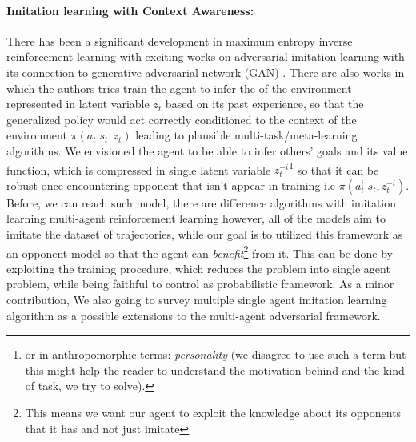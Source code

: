 \paragraph{Imitation learning with Context Awareness: } There has been a significant development in maximum entropy inverse reinforcement learning \cite{ziebart2008maximum} with exciting works on adversarial imitation learning \cite{ho2016generative, fu2017learning, ghasemipour2019divergence} with its connection to generative adversarial network (GAN) \cite{goodfellow2014generative, finn2016connection}. There are also works \cite{petangoda2019disentangled, rakelly2019efficient, yu2019meta} in which the authors tries train the agent to infer the  of the environment represented in latent variable $z_t$ based on its past experience, so that the generalized policy would act correctly conditioned to the context of the environment $\pi(a_t | s_t, z_t)$ leading to plausible multi-task/meta-learning algorithms. We envisioned the agent to be able to infer others' goals and its value function, which is compressed in single latent variable $z_t^{-i}$\footnote{or in anthropomorphic terms: \textit{personality} (we disagree to use such a term but this might help the reader to understand the motivation behind and the kind of task, we try to solve).} so that it can be robust once encountering opponent that isn't appear in training i.e $\pi(a_t^i | s_t, z^{-i}_t)$. Before, we can reach such model, there are difference algorithms with imitation learning multi-agent reinforcement learning \cite{song2018multi, yu2019multi, liu2020multi} however, all of the models aim to imitate the dataset of trajectories, while our goal is to utilized this framework as an opponent model so that the agent can \textit{benefit}\footnote{This means we want our agent to exploit the knowledge about its opponents that it has and not just imitate} from it. This can be done by exploiting the training procedure, which reduces the problem into single agent problem, while being faithful to control as probabilistic framework. As a minor contribution, We also going to survey multiple single agent imitation learning algorithm as a possible extensions to the multi-agent adversarial framework.

